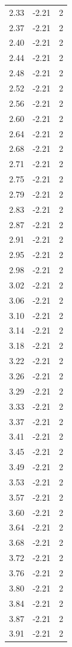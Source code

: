 \begin{longtable}{lrr}
  2.33 & -2.21 & 2 \\
  2.37 & -2.21 & 2 \\
  2.40 & -2.21 & 2 \\
  2.44 & -2.21 & 2 \\
  2.48 & -2.21 & 2 \\
  2.52 & -2.21 & 2 \\
  2.56 & -2.21 & 2 \\
  2.60 & -2.21 & 2 \\
  2.64 & -2.21 & 2 \\
  2.68 & -2.21 & 2 \\
  2.71 & -2.21 & 2 \\
  2.75 & -2.21 & 2 \\
  2.79 & -2.21 & 2 \\
  2.83 & -2.21 & 2 \\
  2.87 & -2.21 & 2 \\
  2.91 & -2.21 & 2 \\
  2.95 & -2.21 & 2 \\
  2.98 & -2.21 & 2 \\
  3.02 & -2.21 & 2 \\
  3.06 & -2.21 & 2 \\
  3.10 & -2.21 & 2 \\
  3.14 & -2.21 & 2 \\
  3.18 & -2.21 & 2 \\
  3.22 & -2.21 & 2 \\
  3.26 & -2.21 & 2 \\
  3.29 & -2.21 & 2 \\
  3.33 & -2.21 & 2 \\
  3.37 & -2.21 & 2 \\
  3.41 & -2.21 & 2 \\
  3.45 & -2.21 & 2 \\
  3.49 & -2.21 & 2 \\
  3.53 & -2.21 & 2 \\
  3.57 & -2.21 & 2 \\
  3.60 & -2.21 & 2 \\
  3.64 & -2.21 & 2 \\
  3.68 & -2.21 & 2 \\
  3.72 & -2.21 & 2 \\
  3.76 & -2.21 & 2 \\
  3.80 & -2.21 & 2 \\
  3.84 & -2.21 & 2 \\
  3.87 & -2.21 & 2 \\
  3.91 & -2.21 & 2 \\

\end{longtable}

